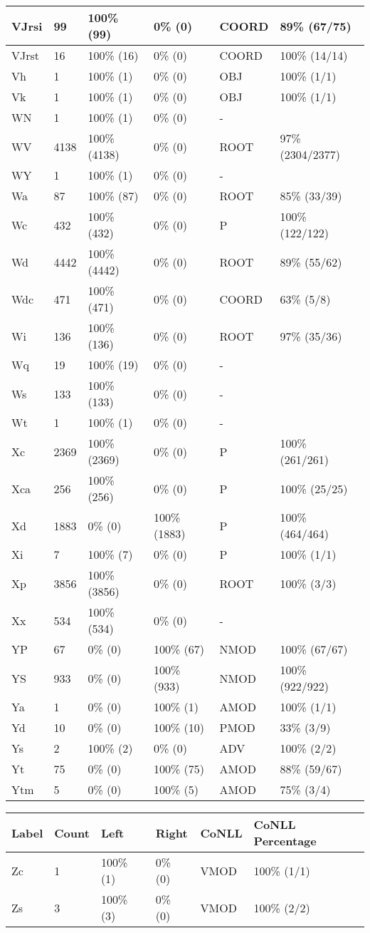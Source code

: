 \begin{figure*}
\begin{tabular}{|l|l|l|l||l|l|}
 VJrsi & 99 & 100\% (99) & 0\% (0) & COORD & 89\% (67/75) \\ 
\hline
 VJrst & 16 & 100\% (16) & 0\% (0) & COORD & 100\% (14/14) \\ 
\hline
 Vh & 1 & 100\% (1) & 0\% (0) & OBJ & 100\% (1/1) \\ 
\hline
 Vk & 1 & 100\% (1) & 0\% (0) & OBJ & 100\% (1/1) \\ 
\hline
 WN & 1 & 100\% (1) & 0\% (0) & - &  \\ 
\hline
 WV & 4138 & 100\% (4138) & 0\% (0) & ROOT & 97\% (2304/2377) \\ 
\hline
 WY & 1 & 100\% (1) & 0\% (0) & - &  \\ 
\hline
 Wa & 87 & 100\% (87) & 0\% (0) & ROOT & 85\% (33/39) \\ 
\hline
 Wc & 432 & 100\% (432) & 0\% (0) & P & 100\% (122/122) \\ 
\hline
 Wd & 4442 & 100\% (4442) & 0\% (0) & ROOT & 89\% (55/62) \\ 
\hline
 Wdc & 471 & 100\% (471) & 0\% (0) & COORD & 63\% (5/8) \\ 
\hline
 Wi & 136 & 100\% (136) & 0\% (0) & ROOT & 97\% (35/36) \\ 
\hline
 Wq & 19 & 100\% (19) & 0\% (0) & - &  \\ 
\hline
 Ws & 133 & 100\% (133) & 0\% (0) & - &  \\ 
\hline
 Wt & 1 & 100\% (1) & 0\% (0) & - &  \\ 
\hline
 Xc & 2369 & 100\% (2369) & 0\% (0) & P & 100\% (261/261) \\ 
\hline
 Xca & 256 & 100\% (256) & 0\% (0) & P & 100\% (25/25) \\ 
\hline
 Xd & 1883 & 0\% (0) & 100\% (1883) & P & 100\% (464/464) \\ 
\hline
 Xi & 7 & 100\% (7) & 0\% (0) & P & 100\% (1/1) \\ 
\hline
 Xp & 3856 & 100\% (3856) & 0\% (0) & ROOT & 100\% (3/3) \\ 
\hline
 Xx & 534 & 100\% (534) & 0\% (0) & - &  \\ 
\hline
 YP & 67 & 0\% (0) & 100\% (67) & NMOD & 100\% (67/67) \\ 
\hline
 YS & 933 & 0\% (0) & 100\% (933) & NMOD & 100\% (922/922) \\ 
\hline
 Ya & 1 & 0\% (0) & 100\% (1) & AMOD & 100\% (1/1) \\ 
\hline
 Yd & 10 & 0\% (0) & 100\% (10) & PMOD & 33\% (3/9) \\ 
\hline
 Ys & 2 & 100\% (2) & 0\% (0) & ADV & 100\% (2/2) \\ 
\hline
 Yt & 75 & 0\% (0) & 100\% (75) & AMOD & 88\% (59/67) \\ 
\hline
 Ytm & 5 & 0\% (0) & 100\% (5) & AMOD & 75\% (3/4) \\ 
\hline
\end{tabular}
\end{figure*}
\begin{figure*}
\begin{tabular}{|l|l|l|l||l|l|}
\hline
Label & Count & Left & Right & CoNLL & CoNLL Percentage\\ 
\hline
 Zc & 1 & 100\% (1) & 0\% (0) & VMOD & 100\% (1/1) \\ 
\hline
 Zs & 3 & 100\% (3) & 0\% (0) & VMOD & 100\% (2/2) \\ 
\hline
\end{tabular}
\end{figure*}
